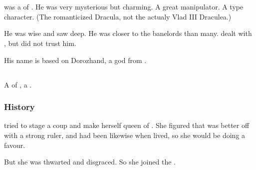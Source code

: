\chapter{\TiphredSerah}















\section{\Dorzand}
\index{\Dorzand}
\Dorzand was a \sathariah of \TiphredSerah.
He was very mysterious but charming.
A great manipulator.
A  type character. 
(The romanticized Dracula, not the actualy Vlad III Draculea.)

He was wise and saw deep.
He was closer to the banelords than many.
\Azraid dealt with \Dorzand, but did not trust him.

His name is based on Dorozhand, a god from 
\cite[]{LordDunsany:TheGodsofPegana}. 















\section{\Ishicah}
\index{\Ishicah}
A \resvil{} of \TiphredSerah, a \sathariah{}. 









\subsection{History}
\Ishicah{} tried to stage a coup and make herself queen of \TiphredSerah. 
She figured that \CiriathSepher{} was better off with a strong ruler, and \Mystraacht{} had been likewise when \Zachirah{} lived, so she would be doing \TiphredSerah{} a favour. 

But she was thwarted and disgraced. 
So she joined the . 

